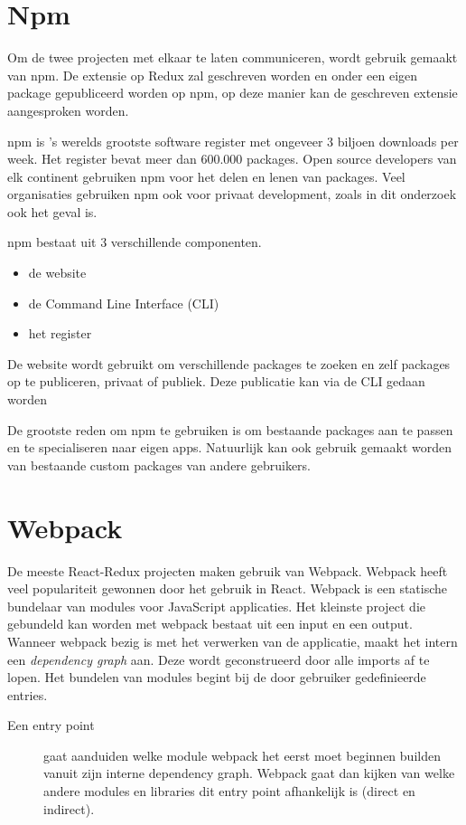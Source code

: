 \section{Npm}
Om de twee projecten met elkaar te laten communiceren, wordt gebruik gemaakt van npm. De extensie op Redux zal geschreven worden en onder een eigen package gepubliceerd worden op npm, op deze manier kan de geschreven extensie aangesproken worden. 

npm is 's werelds grootste software register met ongeveer 3 biljoen downloads per week. Het register bevat meer dan 600.000 packages. Open source developers van elk continent gebruiken npm voor het delen en lenen van packages. Veel organisaties gebruiken npm ook voor privaat development, zoals in dit onderzoek ook het geval is. 

npm bestaat uit 3 verschillende componenten.
\begin{itemize}
	\item de website
	\item de Command Line Interface (CLI)
	\item het register
	
\end{itemize}

De website wordt gebruikt om verschillende packages te zoeken en zelf packages op te publiceren, privaat of publiek. Deze publicatie kan via de CLI gedaan worden

De grootste reden om npm te gebruiken is om bestaande packages aan te passen en te specialiseren naar eigen apps. Natuurlijk kan ook gebruik gemaakt worden van bestaande custom packages van andere gebruikers.
\autocite{npm}

\section{Webpack}
De meeste React-Redux projecten maken gebruik van Webpack. Webpack heeft veel populariteit gewonnen door het gebruik in React. Webpack is een statische bundelaar van modules voor JavaScript applicaties. Het kleinste project die gebundeld kan worden met webpack bestaat uit een input en een output. Wanneer webpack bezig is met het verwerken van de applicatie, maakt het intern een \textit{dependency graph} aan. Deze wordt geconstrueerd door alle imports af te lopen. Het bundelen van modules begint bij de door gebruiker gedefinieerde entries.
\begin{description}
	\item[Een entry point] 
	 gaat aanduiden welke module webpack het eerst moet beginnen builden vanuit zijn interne dependency graph. Webpack gaat dan kijken van welke andere modules en libraries dit entry point afhankelijk is (direct en indirect). 
\end{description}

